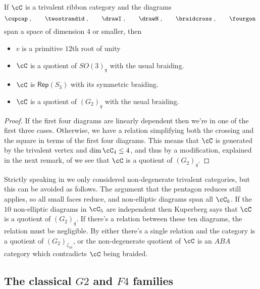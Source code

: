 \documentclass[12pt]{amsart}
\begin{document}
\begin{proposition} \label{prop:dim4}
If $\cC$ is a trivalent ribbon category and the diagrams  
  \[
  \cupcap\;,\qquad\twostrandid\;,
    \qquad\drawI\;,\qquad\drawH\;,\qquad\braidcross\;,\qquad\fourgon\;
   \]
span a space of dimension $4$ or smaller, then
\begin{itemize}
\item $v$ is a primitive $12$th root of unity
\item $\cC$ is a quotient of $SO(3)_q$ with the usual braiding.
\item $\cC$ is $\mathsf{Rep}(S_3)$ with its symmetric braiding.
\item $\cC$ is a quotient of $(G_2)_q$ with the usual braiding.
\end{itemize}
\end{proposition}
\begin{proof}
If the first four diagrams are linearly dependent then we're in one of the
first three cases.  Otherwise, we have a relation simplifying both the
crossing and the square in terms of the first four diagrams.  This means that
$\cC$ is generated by the trivalent vertex and $\dim \cC_4 \leq 4$, and thus
by a modification, explained in the next remark, of \cite[\S 5]{MR3624901} we see that $\cC$ is a
quotient of $(G_2)_q$.
\end{proof}

\begin{remark}
Strictly speaking in \cite{MR3624901} we only considered non-degenerate trivalent categories, but this can be avoided as follows.  The argument that the pentagon reduces still applies, so all small faces reduce, and non-elliptic diagrams span all $\cC_k$.  If the $10$ non-elliptic diagrams in $\cC_5$ are independent then Kuperberg \cite{MR1265145} says that $\cC$ is a quotient of $(G_2)_q$.  If there's a relation between these ten diagrams, the relation must be negligible.  By \cite{MR3624901} either there's a single relation and the category is a quotient of $(G_2)_{\zeta_{10}}$, or the non-degenerate quotient of $\cC$ is an $ABA$ category which contradicts $\cC$ being braided.
\end{remark}

\subsection{The classical $G2$ and $F4$ families}
\end{document}
